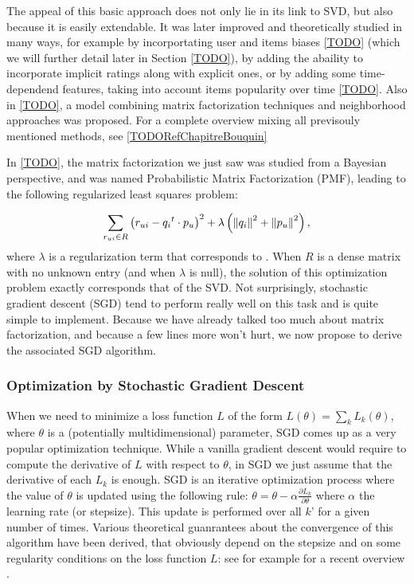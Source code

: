 The appeal of this basic approach does not only lie in its link to SVD, but
also because it is easily extendable. It was later improved and theoretically
studied in many ways, for example by incorportating user and items biases
\ref{TODO} (which we will further detail later in Section \ref{TODO}), by
adding the abaility to incorporate implicit ratings along with explicit ones,
or by adding some time-dependend features, taking into account items popularity
over time \ref{TODO}. Also in \ref{TODO}, a model combining matrix
factorization techniques and neighborhood approaches was proposed. For a
complete overview mixing all previsouly mentioned methods, see
\ref{TODORefChapitreBouquin}

In \ref{TODO}, the matrix factorization we just saw was studied from a Bayesian
perspective, and was named Probabilistic Matrix Factorization (PMF), leading to
the following regularized least squares problem:

$$
\sum_{r_{ui} \in R} \left(r_{ui} - {q_i}^t \cdot p_u \right)^2 +
\lambda\left({\left\lVert q_i\right\rVert}_{}^2 + {\left\lVert p_u\right\rVert}_{}^2\right),
$$
where $\lambda$ is a regularization term that corresponds to . When
$R$ is a dense matrix with no unknown entry (and when $\lambda$ is null), the
solution of this optimization problem exactly corresponds that of the SVD.  Not
surprisingly, stochastic gradient descent (SGD) tend to perform really well on
this task and is quite simple to implement. Because we have already talked too
much about matrix factorization, and because a few lines more won't hurt, we
now propose to derive the associated SGD algorithm.

\subsubsection{Optimization by Stochastic Gradient Descent}

When we need to minimize a loss function $L$ of the form $L(\theta) = \sum_k
L_k(\theta)$, where $\theta$ is a (potentially multidimensional) parameter, SGD
comes up as a very popular optimization technique. While a vanilla gradient
descent would require to compute the derivative of $L$ with respect to
$\theta$, in SGD we just assume that the derivative of each $L_k$ is enough.
SGD is an iterative optimization process where the value of $\theta$ is updated
using the following rule: $\theta = \theta - \alpha \frac{\partial
L_k}{\partial \theta}$ where $\alpha$ the learning rate (or stepsize). This
update is performed over all $k$' for a given number of times. Various
theoretical guanrantees about the convergence of this algorithm have been
derived, that obviously depend on the stepsize and on some regularity
conditions on the loss function $L$: see for example  for a recent overview
\cite{BotCurNoc16}.

